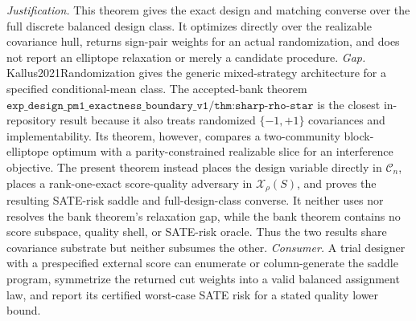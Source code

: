 \documentclass{article}
\begin{document}
\par\smallskip\noindent \textit{Justification.} This theorem gives the exact design and matching converse over the full discrete balanced design class. It optimizes directly over the realizable covariance hull, returns sign-pair weights for an actual randomization, and does not report an elliptope relaxation or merely a candidate procedure. \textit{Gap.} Kallus2021Randomization gives the generic mixed-strategy architecture for a specified conditional-mean class. The accepted-bank theorem \(\texttt{exp\_design\_pm1\_exactness\_boundary\_v1/thm:sharp-rho-star}\) is the closest in-repository result because it also treats randomized \(\{-1,+1\}\) covariances and implementability. Its theorem, however, compares a two-community block-elliptope optimum with a parity-constrained realizable slice for an interference objective. The present theorem instead places the design variable directly in \(\mathcal C_n\), places a rank-one-exact score-quality adversary in \(\mathcal X_\rho(S)\), and proves the resulting SATE-risk saddle and full-design-class converse. It neither uses nor resolves the bank theorem's relaxation gap, while the bank theorem contains no score subspace, quality shell, or SATE-risk oracle. Thus the two results share covariance substrate but neither subsumes the other. \textit{Consumer.} A trial designer with a prespecified external score can enumerate or column-generate the saddle program, symmetrize the returned cut weights into a valid balanced assignment law, and report its certified worst-case SATE risk for a stated quality lower bound.
\end{document}
